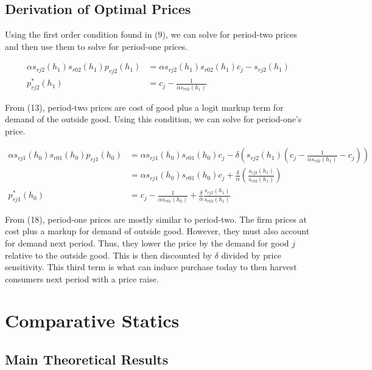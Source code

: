 \documentclass[12pt]{article}
\theoremstyle{definition}
\theoremstyle{remark}
\begin{document}
\subsection{Derivation of Optimal Prices}
\label{subsec:price-derivation}

Using the first order condition found in (9), we can solve for period-two prices
and then use them to solve for period-one prices.

\begin{align}
  \alpha s_{rj2}(h_1)s_{r02}(h_1)p_{rj2}(h_1) &= \alpha s_{rj2}(h_1)s_{r02}(h_1)c_j
  - s_{rj2}(h_1) \\
  p_{rj2}^*(h_1) &= c_j - \frac{1}{\alpha s_{r02}(h_1)}
\end{align}

From (13), period-two prices are cost of good plus a logit markup term for
demand of the outside good. Using this condition, we can solve for period-one's
price.

\begin{align}
  \alpha s_{rj1}(h_0)s_{r01}(h_0)p_{rj1}(h_0) &= \alpha
  s_{rj1}(h_0)s_{r01}(h_0)c_j - \delta(s_{rj2}(h_1)(c_j - \frac{1}{\alpha
  s_{r02}(h_1)} - c_j)) \\
  &= \alpha
  s_{rj1}(h_0)s_{r01}(h_0)c_j +
  \frac{\delta}{\alpha}(\frac{s_{rj2}(h_1)}{s_{r02}(h_1)}) \\
  p_{rj1}^*(h_0) &= c_j - \frac{1}{\alpha s_{r01}(h_0)} +
  \frac{\delta}{\alpha}\frac{s_{rj2}(h_1)}{s_{r02}(h_1)}
\end{align}

From (18), period-one prices are mostly similar to period-two. The firm prices
at cost plus a markup for demand of outside good. However, they must also
account for demand next period. Thus, they lower the price by the demand for
good $j$ relative to the outside good. This is then discounted by $\delta$
divided by price sensitivity. This third term is what can induce purchase today
to then harvest consumers next period with a price raise.



\section{Comparative Statics}
\label{sec:comparative-statics}
\subsection{Main Theoretical Results}
\end{document}
